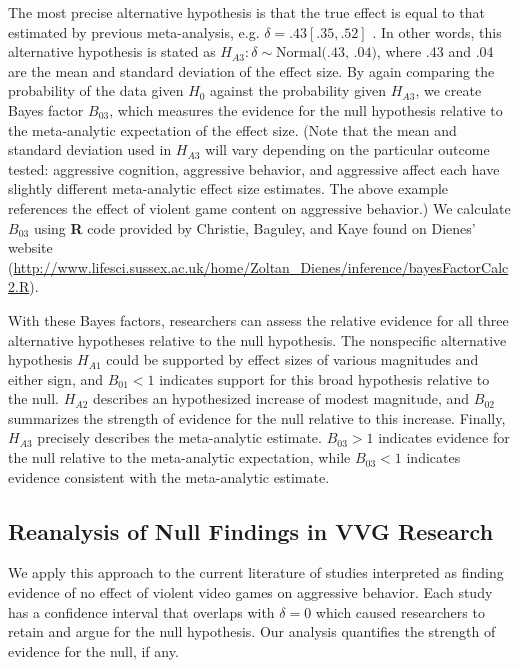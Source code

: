 \documentclass[man]{apa6}
\begin{document}
The most precise alternative hypothesis is that the true effect is equal to that estimated by previous meta-analysis, e.g. $\delta = .43 [.35, .52]$ \citep{Anderson:etal:2010}.  In other words, this alternative hypothesis is stated as $H_{A3}: \delta \sim{} \mbox{Normal(.43, .04)}$, where .43 and .04 are the mean and standard deviation of the effect size. 
By again comparing the probability of the data given $H_0$ against the probability given $H_{A3}$, we create Bayes factor $B_{03}$, which measures the evidence for the null hypothesis relative to the meta-analytic expectation of the effect size. (Note that the mean and standard deviation used in $H_{A3}$ will vary depending on the particular outcome tested: aggressive cognition, aggressive behavior, and aggressive affect each have slightly different meta-analytic effect size estimates. The above example references the effect of violent game content on aggressive behavior.)
We calculate $B_{03}$ using {\bf R} code provided by Christie, Baguley, and Kaye found on Dienes' website (\url{http://www.lifesci.sussex.ac.uk/home/Zoltan_Dienes/inference/bayesFactorCalc2.R}).  %

With these Bayes factors, researchers can assess the relative evidence for all three alternative hypotheses relative to the null hypothesis. The nonspecific alternative hypothesis $H_{A1}$ could be supported by effect sizes of various magnitudes and either sign, and $B_{01} < 1$ indicates support for this broad hypothesis relative to the null. $H_{A2}$ describes an hypothesized increase of modest magnitude, and $B_{02}$ summarizes the strength of evidence for the null relative to this increase. Finally, $H_{A3}$ precisely describes the meta-analytic estimate. $B_{03} > 1$ indicates evidence for the null relative to the meta-analytic expectation, while $B_{03} < 1$ indicates evidence consistent with the meta-analytic estimate. 

\subsection{Reanalysis of Null Findings in VVG Research}
We apply this approach to the current literature of studies interpreted as finding evidence of no effect of violent video games on aggressive behavior. Each study has a confidence interval that overlaps with $\delta = 0$ which caused researchers to retain and argue for the null hypothesis. Our analysis quantifies the strength of evidence for the null, if any.
\end{document}
